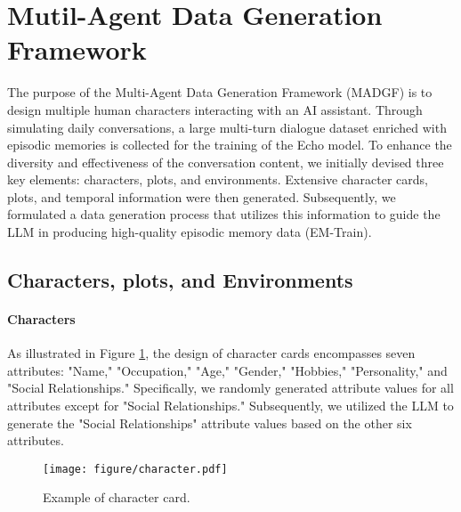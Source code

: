 \section{Mutil-Agent Data Generation Framework}
\label{sec:approach}

The purpose of the Multi-Agent Data Generation Framework (MADGF) is to design multiple human characters interacting with an AI assistant. Through simulating daily conversations, a large multi-turn dialogue dataset enriched with episodic memories is collected for the training of the Echo model. To enhance the diversity and effectiveness of the conversation content, we initially devised three key elements: characters, plots, and environments. Extensive character cards, plots, and temporal information were then generated. Subsequently, we formulated a data generation process that utilizes this information to guide the LLM in producing high-quality episodic memory data (EM-Train).


\subsection{Characters, plots, and Environments}
\label{sec:three key}
\paragraph{Characters}
As illustrated in Figure \ref{fig:character}, the design of character cards encompasses seven attributes: "Name," "Occupation," "Age," "Gender," "Hobbies," "Personality," and "Social Relationships." Specifically, we randomly generated attribute values for all attributes except for "Social Relationships." Subsequently, we utilized the LLM to generate the "Social Relationships" attribute values based on the other six attributes. 


\begin{figure}[t!]
\centering

\texttt{[image: figure/character.pdf]} \\

\caption{Example of character card.}
\label{fig:character}
\end{figure}

